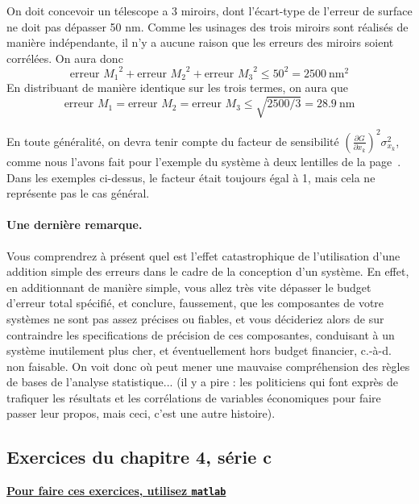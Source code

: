 \documentclass[main.tex]{subfiles}
\begin{document}
On doit concevoir un télescope a 3 miroirs, dont l'écart-type de l'erreur de surface ne doit pas dépasser 50 nm. Comme les usinages des trois miroirs sont réalisés de manière indépendante, il n'y a aucune raison que les erreurs des miroirs soient corrélées. On aura donc
$$
    \text{erreur $M_1$}^2+\text{erreur $M_2$}^2+\text{erreur $M_3$}^2\le 50^2=2500\ \text{nm}^2
$$
En distribuant de manière identique sur les trois termes, on aura que
$$
    \text{erreur $M_1$}=\text{erreur $M_2$}=\text{erreur $M_3$}\le \sqrt{2500/3}=28.9\ \text{nm}
$$

En toute généralité, on devra tenir compte du facteur de sensibilité $\left(\frac{\partial G}{\partial x_k}\right)^2\sigma_{x_k}^2$, comme nous l'avons fait pour l'exemple du système à deux lentilles de la page~\pageref{sec:exopt}. Dans les exemples ci-dessus, le facteur était toujours égal à 1, mais cela ne représente pas le cas général.

\paragraph{Une dernière remarque.} Vous comprendrez à présent quel est l'effet catastrophique de l'utilisation d'une addition simple des erreurs dans le cadre de la conception d'un système. En effet, en additionnant de manière simple, vous allez très vite dépasser le budget d'erreur total spécifié, et conclure, faussement, que les composantes de votre systèmes ne sont pas assez précises ou fiables, et vous décideriez alors de sur contraindre les specifications de précision de ces composantes, conduisant à un système inutilement plus cher, et éventuellement hors budget financier, c.-à-d. non faisable. On voit donc où peut mener une mauvaise compréhension des règles de bases de l'analyse statistique... (il y a pire : les politiciens qui font exprès de trafiquer les résultats et les corrélations de variables économiques pour faire passer leur propos, mais ceci, c'est une autre histoire).

\fi
\iftrue

\pagebreak
\newpage


\subsection{Exercices du chapitre 4, série c}

\begin{center}
    \Large \bf {\underline{Pour faire ces exercices, utilisez \texttt{matlab}}}
\end{center}
\end{document}
